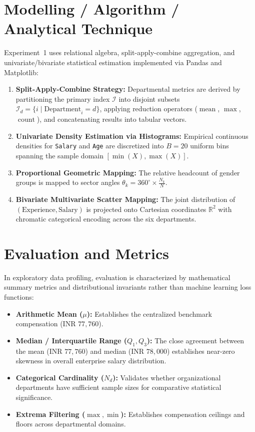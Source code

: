 \documentclass[12pt,a4paper]{report}
\begin{document}
\section{Modelling / Algorithm / Analytical Technique}
Experiment~1 uses relational algebra, split-apply-combine aggregation, and univariate/bivariate statistical estimation implemented via Pandas and Matplotlib:
\begin{enumerate}
    \item \textbf{Split-Apply-Combine Strategy:} Departmental metrics are derived by partitioning the primary index $\mathcal{I}$ into disjoint subsets $\mathcal{I}_d = \{i \mid \text{Department}_i = d\}$, applying reduction operators ($\operatorname{mean}$, $\operatorname{max}$, $\operatorname{count}$), and concatenating results into tabular vectors.
    \item \textbf{Univariate Density Estimation via Histograms:} Empirical continuous densities for \texttt{Salary} and \texttt{Age} are discretized into $B = 20$ uniform bins spanning the sample domain $[\min(X), \max(X)]$.
    \item \textbf{Proportional Geometric Mapping:} The relative headcount of gender groups is mapped to sector angles $\theta_k = 360^\circ \times \frac{N_k}{N}$.
    \item \textbf{Bivariate Multivariate Scatter Mapping:} The joint distribution of $(\text{Experience}, \text{Salary})$ is projected onto Cartesian coordinates $\mathbb{R}^2$ with chromatic categorical encoding across the six departments.
\end{enumerate}

\section{Evaluation and Metrics}
In exploratory data profiling, evaluation is characterized by mathematical summary metrics and distributional invariants rather than machine learning loss functions:
\begin{itemize}
    \item \textbf{Arithmetic Mean ($\mu$):} Establishes the centralized benchmark compensation ($\text{INR } 77,760$).
    \item \textbf{Median / Interquartile Range ($Q_1, Q_3$):} The close agreement between the mean ($\text{INR } 77,760$) and median ($\text{INR } 78,000$) establishes near-zero skewness in overall enterprise salary distribution.
    \item \textbf{Categorical Cardinality ($N_d$):} Validates whether organizational departments have sufficient sample sizes for comparative statistical significance.
    \item \textbf{Extrema Filtering ($\max, \min$):} Establishes compensation ceilings and floors across departmental domains.
\end{itemize}
\end{document}
